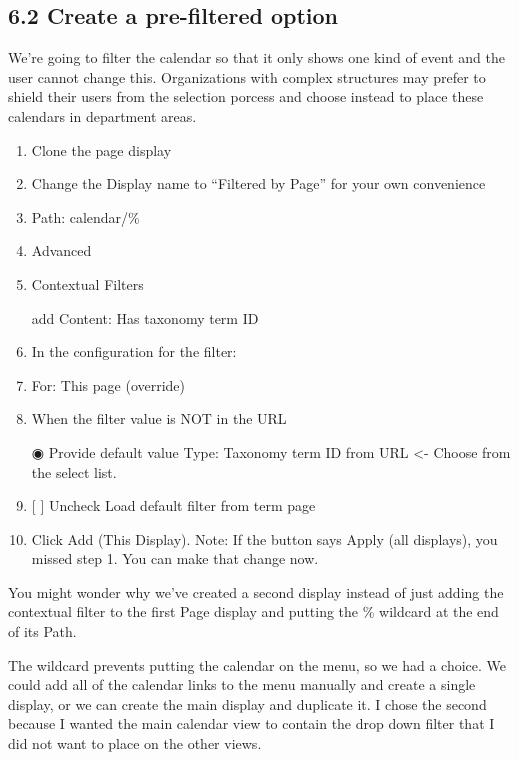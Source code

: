 \documentclass[letterpaper,10pt,english]{sphinxmanual}
\begin{document}
\subsection{6.2 Create a pre-filtered option}
\label{event_calendar:create-a-pre-filtered-option}
We're going to filter the calendar so that it only shows one kind of event and the user cannot change this. Organizations with complex structures  may prefer to shield their users from the selection porcess and choose instead to place these calendars in department areas.
\begin{enumerate}
\item {} 
Clone the page display

\item {} 
Change the Display name to ``Filtered by Page'' for your own convenience

\item {} 
Path: calendar/\%

\item {} 
Advanced

\item {} 
Contextual Filters

add
Content: Has taxonomy term ID

\item {} 
In the configuration for the filter:

\item {} 
For: This page (override)

\item {} 
When the filter value is NOT in the URL

◉ Provide default value
Type: Taxonomy term ID from URL \textless{}- Choose from the select list.

\item {} 
{[} {]} Uncheck Load default filter from term page

\item {} 
Click Add (This Display). Note: If the button says Apply (all displays), you missed step 1. You can make that change now.

\end{enumerate}

You might wonder why we've created a second display instead of just adding the contextual filter to the first Page display and putting the \% wildcard at the end of its Path.

The wildcard prevents putting the calendar on the menu, so we had a choice. We could add all of the calendar links to the menu manually and create a single display, or we can create the main display and duplicate it. I chose the second because I wanted the main calendar view to contain the drop down filter that I did not want to place on the other views.
\end{document}
